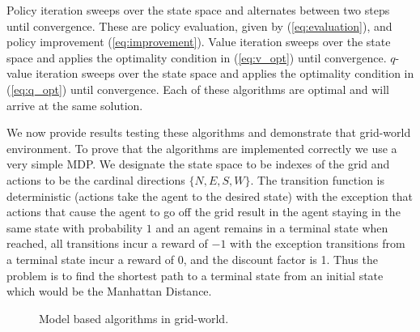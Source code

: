 \documentclass{article}
\begin{document}
Policy iteration sweeps over the state space and alternates between two steps until convergence. These are policy evaluation, given by (\ref{eq:evaluation}), and policy improvement (\ref{eq:improvement}). Value iteration sweeps over the state space and applies the optimality condition in (\ref{eq:v_opt}) until convergence. $q$-value iteration sweeps over the state space and applies the optimality condition in (\ref{eq:q_opt}) until convergence. Each of these algorithms are optimal and will arrive at the same solution.

We now provide results testing these algorithms and demonstrate that grid-world environment. To prove that the algorithms are implemented correctly we use a very simple MDP. We designate the state space to be indexes of the grid and actions to be the cardinal directions $\{N, E, S, W\}$. The transition function is deterministic (actions take the agent to the desired state) with the exception that actions that cause the agent to go off the grid result in the agent staying in the same state with probability $1$ and an agent remains in a terminal state when reached, all transitions incur a reward of $-1$ with the exception transitions from a terminal state incur a reward of $0$, and the discount factor is 1. Thus the problem is to find the shortest path to a terminal state from an initial state which would be the Manhattan Distance.
\begin{figure}[H]
    \centering
    \hfill
    \caption{Model based algorithms in grid-world.}
    \label{fig:model}
\end{figure}
\end{document}
